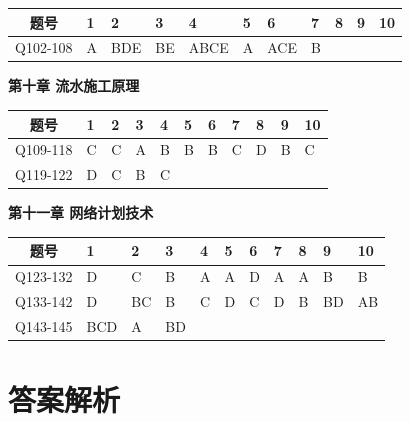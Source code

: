 \documentclass[UTF8,fontset=windows,11pt]{ctexart}
\begin{document}
\begin{tabularx}{\linewidth}{|c|X|X|X|X|X|X|X|X|X|X|}
\hline
\textbf{题号} & \textbf{1} & \textbf{2} & \textbf{3} & \textbf{4} & \textbf{5} & \textbf{6} & \textbf{7} & \textbf{8} & \textbf{9} & \textbf{10} \\
\hline
Q102-108 & A & BDE & BE & ABCE & A & ACE & B &  &  &  \\
\hline
\end{tabularx}
\vspace{0.6em}

\noindent\textbf{\textcolor{examnavy}{第十章  流水施工原理}}\\\vspace{0.3em}

\begin{tabularx}{\linewidth}{|c|X|X|X|X|X|X|X|X|X|X|}
\hline
\textbf{题号} & \textbf{1} & \textbf{2} & \textbf{3} & \textbf{4} & \textbf{5} & \textbf{6} & \textbf{7} & \textbf{8} & \textbf{9} & \textbf{10} \\
\hline
Q109-118 & C & C & A & B & B & B & C & D & B & C \\
\hline
Q119-122 & D & C & B & C &  &  &  &  &  &  \\
\hline
\end{tabularx}
\vspace{0.6em}

\noindent\textbf{\textcolor{examnavy}{第十一章  网络计划技术}}\\\vspace{0.3em}

\begin{tabularx}{\linewidth}{|c|X|X|X|X|X|X|X|X|X|X|}
\hline
\textbf{题号} & \textbf{1} & \textbf{2} & \textbf{3} & \textbf{4} & \textbf{5} & \textbf{6} & \textbf{7} & \textbf{8} & \textbf{9} & \textbf{10} \\
\hline
Q123-132 & D & C & B & A & A & D & A & A & B & B \\
\hline
Q133-142 & D & BC & B & C & D & C & D & B & BD & AB \\
\hline
Q143-145 & BCD & A & BD &  &  &  &  &  &  &  \\
\hline
\end{tabularx}
\vspace{0.6em}

\newpage

\section{答案解析}
\end{document}
